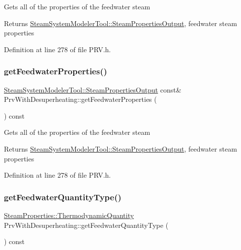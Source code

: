 Gets all of the properties of the feedwater steam \begin{DoxyReturn}{Returns}
\hyperlink{struct_steam_system_modeler_tool_1_1_steam_properties_output}{Steam\+System\+Modeler\+Tool\+::\+Steam\+Properties\+Output}, feedwater steam properties 
\end{DoxyReturn}


Definition at line 278 of file P\+R\+V.\+h.

\mbox{\label{class_prv_with_desuperheating_a8f4594109bda9bc4030c23cee9841fa8}} 
\subsubsection{\texorpdfstring{get\+Feedwater\+Properties()}{getFeedwaterProperties()}\hspace{0.1cm}{\footnotesize\ttfamily [3/3]}}
{\footnotesize\ttfamily \hyperlink{struct_steam_system_modeler_tool_1_1_steam_properties_output}{Steam\+System\+Modeler\+Tool\+::\+Steam\+Properties\+Output} const\& Prv\+With\+Desuperheating\+::get\+Feedwater\+Properties (\begin{DoxyParamCaption}{ }\end{DoxyParamCaption}) const\hspace{0.3cm}{\ttfamily [inline]}}

Gets all of the properties of the feedwater steam \begin{DoxyReturn}{Returns}
\hyperlink{struct_steam_system_modeler_tool_1_1_steam_properties_output}{Steam\+System\+Modeler\+Tool\+::\+Steam\+Properties\+Output}, feedwater steam properties 
\end{DoxyReturn}


Definition at line 278 of file P\+R\+V.\+h.

\mbox{\label{class_prv_with_desuperheating_aa6901e00ecf819d95f79c20ef1775876}} 
\subsubsection{\texorpdfstring{get\+Feedwater\+Quantity\+Type()}{getFeedwaterQuantityType()}\hspace{0.1cm}{\footnotesize\ttfamily [1/3]}}
{\footnotesize\ttfamily \hyperlink{class_steam_properties_ae0294bedf7d178c2d8fb6aed0f62fbff}{Steam\+Properties\+::\+Thermodynamic\+Quantity} Prv\+With\+Desuperheating\+::get\+Feedwater\+Quantity\+Type (\begin{DoxyParamCaption}{ }\end{DoxyParamCaption}) const\hspace{0.3cm}{\ttfamily [inline]}}

